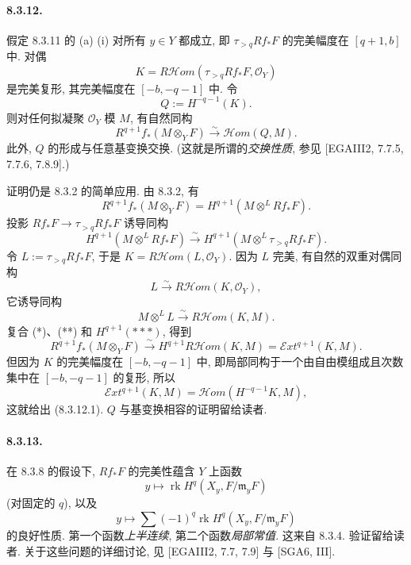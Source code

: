 \paragraph{8.3.12.}
假定 8.3.11 的 (a) (i) 对所有 $y\in Y$ 都成立, 即 $\tau_{>q}Rf_*F$ 的完美幅度在 $[q+1,b]$ 中. 对偶
\[K=R\mathcal Hom(\tau_{>q}Rf_*F,\mathcal O_Y)\]
是完美复形, 其完美幅度在 $[-b,-q-1]$ 中. 令
\[Q:=H^{-q-1}(K).\]
则对任何拟凝聚 $\mathcal O_Y$ 模 $M$, 有自然同构
\begin{equation}R^{q+1}f_*(M\otimes_YF)\xrightarrow\sim\mathcal Hom(Q,M).\tag{8.3.12.1}\label{ch08:eq83121}\end{equation}
此外, $Q$ 的形成与任意基变换交换. (这就是所谓的\emph{交换性质}, 参见 [EGAIII2, 7.7.5, 7.7.6, 7.8.9].)

证明仍是 8.3.2 的简单应用. 由 8.3.2, 有
\begin{equation}R^{q+1}f_*(M\otimes_YF)=H^{q+1}(M\otimes^LRf_*F).\tag{*}\label{ch08:eq8312star}\end{equation}
投影 $Rf_*F\to\tau_{>q}Rf_*F$ 诱导同构
\begin{equation}H^{q+1}(M\otimes^LRf_*F)\xrightarrow\sim H^{q+1}(M\otimes^L\tau_{>q}Rf_*F).\tag{**}\label{ch08:eq8312star2}\end{equation}
令 $L:=\tau_{>q}Rf_*F$, 于是 $K=R\mathcal Hom(L,\mathcal O_Y)$. 因为 $L$ 完美, 有自然的双重对偶同构
\[L\xrightarrow\sim R\mathcal Hom(K,\mathcal O_Y),\]
它诱导同构
\begin{equation}M\otimes^LL\xrightarrow\sim R\mathcal Hom(K,M).\tag{***}\label{ch08:eq8312star3}\end{equation}
复合 (*)、(**) 和 $H^{q+1}(***)$, 得到
\[R^{q+1}f_*(M\otimes_YF)\xrightarrow\sim H^{q+1}R\mathcal Hom(K,M)=\mathcal Ext^{q+1}(K,M).\]
但因为 $K$ 的完美幅度在 $[-b,-q-1]$ 中, 即局部同构于一个由自由模组成且次数集中在 $[-b,-q-1]$ 的复形, 所以
\[\mathcal Ext^{q+1}(K,M)=\mathcal Hom(H^{-q-1}K,M),\]
这就给出 (8.3.12.1). $Q$ 与基变换相容的证明留给读者.

\paragraph{8.3.13.}
在 8.3.8 的假设下, $Rf_*F$ 的完美性蕴含 $Y$ 上函数
\[y\longmapsto\operatorname{rk}H^q(X_y,F/\mathfrak m_yF)\]
(对固定的 $q$), 以及
\[y\longmapsto\sum(-1)^q\operatorname{rk}H^q(X_y,F/\mathfrak m_yF)\]
的良好性质. 第一个函数\emph{上半连续}, 第二个函数\emph{局部常值}. 这来自 8.3.4. 验证留给读者. 关于这些问题的详细讨论, 见 [EGAIII2, 7.7, 7.9] 与 [SGA6, III].

